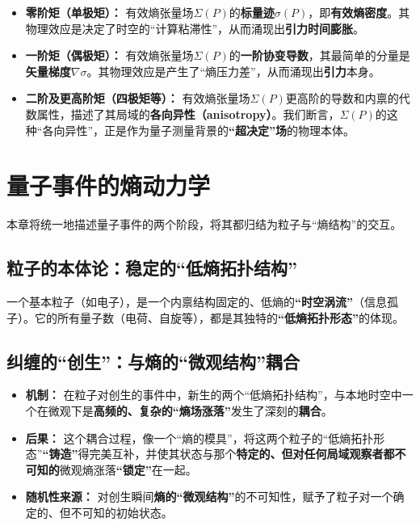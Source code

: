 \documentclass[12pt]{article}
\begin{document}
\begin{itemize}
    \item   \textbf{零阶矩（单极矩）：} 有效熵张量场$\Sigma(P)$的\textbf{标量迹$\sigma(P)$}，即\textbf{有效熵密度}。其物理效应是决定了时空的``计算粘滞性''，从而涌现出\textbf{引力时间膨胀}。
    
    \item   \textbf{一阶矩（偶极矩）：} 有效熵张量场$\Sigma(P)$的\textbf{一阶协变导数}，其最简单的分量是\textbf{矢量梯度$\nabla\sigma$}。其物理效应是产生了``熵压力差''，从而涌现出\textbf{引力}本身。
    
    \item   \textbf{二阶及更高阶矩（四极矩等）：} 有效熵张量场$\Sigma(P)$更高阶的导数和内禀的代数属性，描述了其局域的\textbf{各向异性（anisotropy）}。我们断言，$\Sigma(P)$的这种``各向异性''，正是作为量子测量背景的\textbf{``超决定''场}的物理本体。
\end{itemize}


\section{量子事件的熵动力学}

本章将统一地描述量子事件的两个阶段，将其都归结为粒子与``熵结构''的交互。

\subsection{粒子的本体论：稳定的``低熵拓扑结构''}
一个基本粒子（如电子），是一个内禀结构固定的、低熵的\textbf{``时空涡流''}（信息孤子）。它的所有量子数（电荷、自旋等），都是其独特的\textbf{``低熵拓扑形态''}的体现。

\subsection{纠缠的``创生''：与熵的``微观结构''耦合}
\begin{itemize}
    \item   \textbf{机制：} 在粒子对创生的事件中，新生的两个``低熵拓扑结构''，与本地时空中一个在微观下是\textbf{高频的、复杂的``熵场涨落''}发生了深刻的\textbf{耦合}。
    \item   \textbf{后果：} 这个耦合过程，像一个``熵的模具''，将这两个粒子的``低熵拓扑形态''\textbf{``铸造''}得完美互补，并使其状态与那个\textbf{特定的、但对任何局域观察者都不可知的}微观熵涨落\textbf{``锁定''}在一起。
    \item   \textbf{随机性来源：} 对创生瞬间\textbf{熵的``微观结构''}的不可知性，赋予了粒子对一个确定的、但不可知的初始状态。
\end{itemize}
\end{document}
